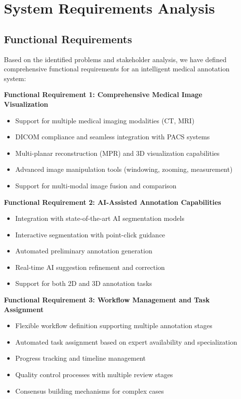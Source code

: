 \section{System Requirements Analysis}

\subsection{Functional Requirements}

Based on the identified problems and stakeholder analysis, we have defined comprehensive functional requirements for an intelligent medical annotation system:

\textbf{Functional Requirement 1: Comprehensive Medical Image Visualization}
\begin{itemize}
    \item Support for multiple medical imaging modalities (CT, MRI)
    \item DICOM compliance and seamless integration with PACS systems
    \item Multi-planar reconstruction (MPR) and 3D visualization capabilities
    \item Advanced image manipulation tools (windowing, zooming, measurement)
    \item Support for multi-modal image fusion and comparison
\end{itemize}

\textbf{Functional Requirement 2: AI-Assisted Annotation Capabilities}
\begin{itemize}
    \item Integration with state-of-the-art AI segmentation models
    \item Interactive segmentation with point-click guidance
    \item Automated preliminary annotation generation
    \item Real-time AI suggestion refinement and correction
    \item Support for both 2D and 3D annotation tasks
\end{itemize}

\textbf{Functional Requirement 3: Workflow Management and Task Assignment}
\begin{itemize}
    \item Flexible workflow definition supporting multiple annotation stages
    \item Automated task assignment based on expert availability and specialization
    \item Progress tracking and timeline management
    \item Quality control processes with multiple review stages
    \item Consensus building mechanisms for complex cases
\end{itemize}

